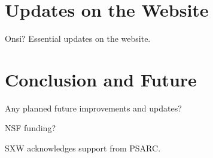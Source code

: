 \documentclass[11pt,preprint]{aastex}
\begin{document}
\begin{CJK*}{UTF8}{gbsn}
\section{Updates on the Website}

Onsi? Essential updates on the website.


\section{Conclusion and Future}\label{sec:conclusion}

Any planned future improvements and updates?


\acknowledgments

NSF funding?

SXW acknowledges support from PSARC.





\clearpage


\end{CJK*}
\end{document}
